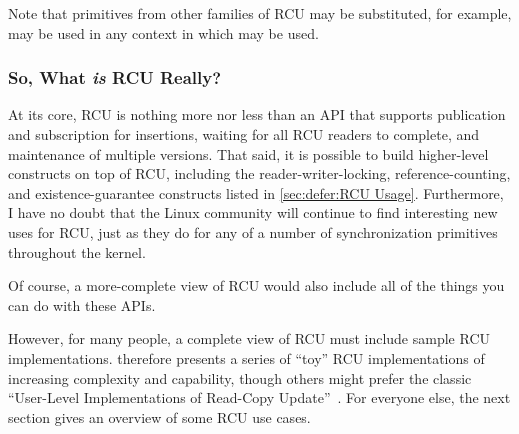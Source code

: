 Note that primitives from other families of RCU may be substituted,
for example,  may be used in any context
in which  may be used.

\subsubsection{So, What \emph{is} RCU Really?}
\label{sec:defer:So; What is RCU Really?}

At its core, RCU is nothing more nor less than an API that supports
publication and subscription for insertions, waiting for all RCU readers
to complete, and maintenance of multiple versions.
That said, it is possible to build higher-level constructs
on top of RCU, including the reader-writer-locking, reference-counting,
and existence-guarantee constructs listed in
\cref{sec:defer:RCU Usage}.
Furthermore, I have no doubt that the Linux community will continue to
find interesting new uses for RCU,
just as they do for any of a number of synchronization
primitives throughout the kernel.

Of course, a more-complete view of RCU would also include
all of the things you can do with these APIs.

However, for many people, a complete view of RCU must include sample
RCU implementations.
 therefore presents a series
of ``toy'' RCU implementations of increasing complexity and capability,
though others might prefer the classic
``User-Level Implementations of Read-Copy
Update''~\cite{MathieuDesnoyers2012URCU}.
For everyone else, the next section gives an overview of some RCU use cases.
